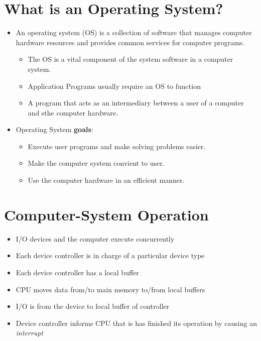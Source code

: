 \documentclass[titlepage]{article}
\begin{document}
  \section*{What is an Operating System?}
  \begin{itemize}
    \item An operating system (OS) is a collection of software that manages computer hardware resources and provides common services for computer programs.
    \begin{itemize}
      \item The OS is a vital component of the system software in a computer system.
      \item Application Programs usually require an OS to function
      \item A program that acts as an intermediary between a user of a computer and sthe computer hardware.
    \end{itemize}
    \item Operating System {\color{red} \textbf{goals}}:
    \begin{itemize}
      \item Execute user programs and make solving problems easier.
      \item Make the computer system convient to user.
      \item Use the computer hardware in an efficient manner.
    \end{itemize}
  \end{itemize}

  \section*{Computer-System Operation}
  \begin{itemize}
    \item I/O devices and the computer execute concurrently
    \item Each device controller is in charge of a particular device type
    \item Each device controller has a local buffer
    \item CPU moves data from/to main memory to/from local buffers
    \item I/O is from the device to local buffer of controller
    \item Device controller informs CPU that is has finished its operation by causing an \textit{interrupt}
  \end{itemize}
\end{document}
